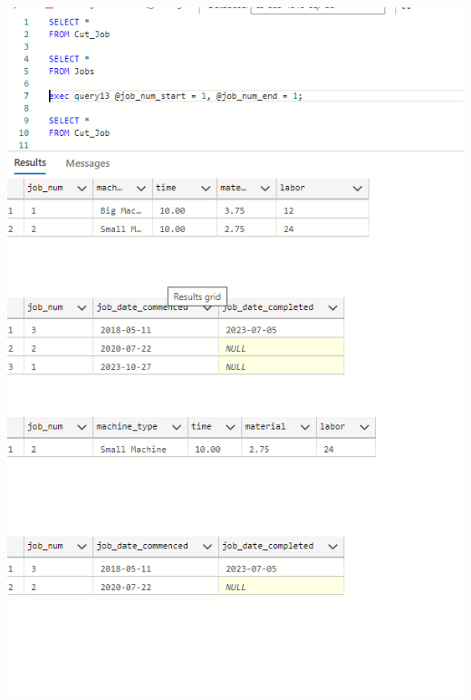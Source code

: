 \documentclass[11pt]{article}
\begin{document}
\begin{enumerate}
\includegraphics[width = \textwidth]{cutdelete2.png}


\end{enumerate}
\end{document}
